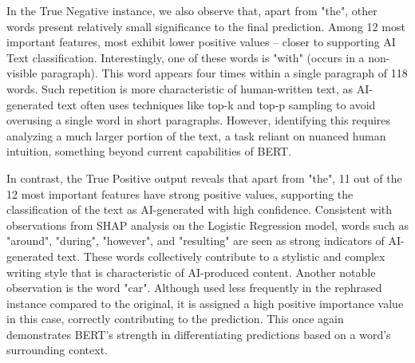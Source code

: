 \vspace{3mm}

In the True Negative instance, we also observe that, apart from "the", other words present relatively small significance to the final prediction. Among 12 most important features, most exhibit lower positive values -- closer to supporting AI Text classification. Interestingly, one of these words is "with" (occurs in a non-visible paragraph). This word appears four times within a single paragraph of 118 words. Such repetition is more characteristic of human-written text, as AI-generated text often uses techniques like top-k and top-p sampling to avoid overusing a single word in short paragraphs. However, identifying this requires analyzing a much larger portion of the text, a task reliant on nuanced human intuition, something beyond current capabilities of BERT.

\vspace{3mm}

In contrast, the True Positive output reveals that apart from "the", 11 out of the 12 most important features have strong positive values, supporting the classification of the text as AI-generated with high confidence. Consistent with observations from SHAP analysis on the Logistic Regression model, words such as "around", "during", "however", and "resulting" are seen as strong indicators of AI-generated text. These words collectively contribute to a stylistic and complex writing style that is characteristic of AI-produced content. Another notable observation is the word "car". Although used less frequently in the rephrased instance compared to the original, it is assigned a high positive importance value in this case, correctly contributing to the prediction. This once again demonstrates BERT's strength in differentiating predictions based on a word's surrounding context.

